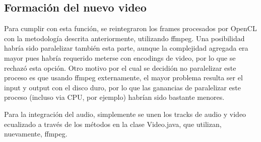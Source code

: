 \documentclass[12pt,spanish]{article}
\begin{document}
	\subsection{Formaci\'on del nuevo video}
	Para cumplir con esta funci\'on, se reintegraron los frames procesados por OpenCL con la metodolog\'ia descrita anteriormente, utilizando ffmpeg. Una posibilidad habr\'ia sido paralelizar tambi\'en esta parte, aunque la complejidad agregada era mayor pues habr\'ia requerido meterse con encodings de video, por lo que se rechaz\'o esta opci\'on. Otro motivo por el cual se decidi\'on no paralelizar este proceso es que usando ffmpeg externamente, el mayor problema resulta ser el input y output con el disco duro, por lo que las ganancias de paralelizar este proceso (incluso via CPU, por ejemplo) habr\'ian sido bastante menores.

	Para la integraci\'on del audio, simplemente se unen los tracks de audio y video ecualizado a trav\'es de los m\'etodos en la clase Video.java, que utilizan, nuevamente, ffmpeg.
\end{document}
